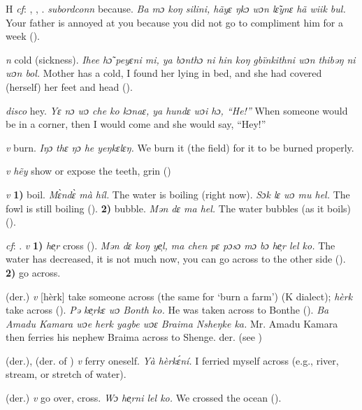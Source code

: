 \begin{letter}{H}
 \textit{cf}: , , . \textit{subordconn} because. \textit{Ba mɔ koŋ silini, hãyɛ ŋkɔ wɔn lɛ̃ynɛ hã wiik bul.} Your father is annoyed at you because you did not go to compliment him for a week (\citealt{Pichl1967}). 

 \textit{n} cold (sickness). \textit{Ihee hɔ̃ peyɛni mi, ya bɔnthɔ ni hin koŋ gbïnkithni wɔn thibəŋ ni wɔn bol.} Mother has a cold, I found her lying in bed, and she had covered (herself) her feet and head (\citealt{Pichl1967}). 

 \textit{disco} hey. \textit{Yɛ nɔ wɔ che ko kɔnaɛ, ya hundɛ wɔi hɔ, “He!”} When someone would be in a corner, then I would come and she would say, “Hey!”

 \textit{v} burn. \textit{Iŋɔ thɛ ŋɔ he yeŋkɛlɛŋ.} We burn it (the field) for it to be burned properly.

 \textit{v} \textit{hẽy} show or expose the teeth, grin (\citealt{Pichl1967})

 \textit{v} \textbf{1)} boil. \textit{Mɛ̀ndɛ̀ mà híl.} The water is boiling (right now). \textit{Sɔk lɛ wɔ mu hel.} The fowl is still boiling (\citealt{Pichl1967}). \textbf{2)} bubble. \textit{Mən dɛ ma hel.} The water bubbles (as it boils) (\citealt{Pichl1967}).

 \textit{cf}: . \textit{v} \textbf{1)} \textit{he̹r} cross (\citealt{Pichl1967}). \textit{Mən dɛ koŋ ye̹l, ma chen pɛ pɔsɔ mɔ bɔ he̹r lel ko.} The water has decreased, it is not much now, you can go across to the other side (\citealt{Pichl1967}). \textbf{2)} go across.

 (der.) \textit{v} [hèrk] take someone across (the same for ‘burn a farm') (K dialect); \textit{hèrk} take across (\citealt{Pichl1967}). \textit{Pə ke̹rkɛ wɔ Bonth ko.} He was taken across to Bonthe (\citealt{Pichl1967}). \textit{Ba Amadu Kamara wɔe herk yagbe wɔɛ Braima Nsheŋke ka.} Mr. Amadu Kamara then ferries his nephew Braima across to Shenge. der.  (see )

 (der.), (der. of ) \textit{v} ferry oneself. \textit{Yà hèrkɛ́ní.} I ferried myself across (e.g., river, stream, or stretch of water). 

 (der.) \textit{v} go over, cross. \textit{Wɔ he̹rni lel ko.} We crossed the ocean (\citealt{Pichl1967}).


\end{letter}
